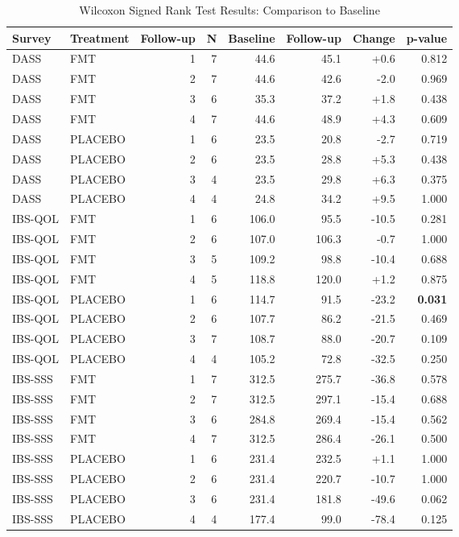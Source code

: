 \begin{table}[htbp]
\centering
\caption{Wilcoxon Signed Rank Test Results: Comparison to Baseline}
\label{tab:wilcoxon_baseline}
\begin{tabular}{llrrrrrr}
\hline
Survey & Treatment & Follow-up & N & Baseline & Follow-up & Change & p-value \\
\hline
DASS & FMT & 1 & 7 & 44.6 & 45.1 & +0.6 & 0.812 \\
DASS & FMT & 2 & 7 & 44.6 & 42.6 & -2.0 & 0.969 \\
DASS & FMT & 3 & 6 & 35.3 & 37.2 & +1.8 & 0.438 \\
DASS & FMT & 4 & 7 & 44.6 & 48.9 & +4.3 & 0.609 \\
DASS & PLACEBO & 1 & 6 & 23.5 & 20.8 & -2.7 & 0.719 \\
DASS & PLACEBO & 2 & 6 & 23.5 & 28.8 & +5.3 & 0.438 \\
DASS & PLACEBO & 3 & 4 & 23.5 & 29.8 & +6.3 & 0.375 \\
DASS & PLACEBO & 4 & 4 & 24.8 & 34.2 & +9.5 & 1.000 \\
IBS-QOL & FMT & 1 & 6 & 106.0 & 95.5 & -10.5 & 0.281 \\
IBS-QOL & FMT & 2 & 6 & 107.0 & 106.3 & -0.7 & 1.000 \\
IBS-QOL & FMT & 3 & 5 & 109.2 & 98.8 & -10.4 & 0.688 \\
IBS-QOL & FMT & 4 & 5 & 118.8 & 120.0 & +1.2 & 0.875 \\
IBS-QOL & PLACEBO & 1 & 6 & 114.7 & 91.5 & -23.2 & \textbf{0.031} \\
IBS-QOL & PLACEBO & 2 & 6 & 107.7 & 86.2 & -21.5 & 0.469 \\
IBS-QOL & PLACEBO & 3 & 7 & 108.7 & 88.0 & -20.7 & 0.109 \\
IBS-QOL & PLACEBO & 4 & 4 & 105.2 & 72.8 & -32.5 & 0.250 \\
IBS-SSS & FMT & 1 & 7 & 312.5 & 275.7 & -36.8 & 0.578 \\
IBS-SSS & FMT & 2 & 7 & 312.5 & 297.1 & -15.4 & 0.688 \\
IBS-SSS & FMT & 3 & 6 & 284.8 & 269.4 & -15.4 & 0.562 \\
IBS-SSS & FMT & 4 & 7 & 312.5 & 286.4 & -26.1 & 0.500 \\
IBS-SSS & PLACEBO & 1 & 6 & 231.4 & 232.5 & +1.1 & 1.000 \\
IBS-SSS & PLACEBO & 2 & 6 & 231.4 & 220.7 & -10.7 & 1.000 \\
IBS-SSS & PLACEBO & 3 & 6 & 231.4 & 181.8 & -49.6 & 0.062 \\
IBS-SSS & PLACEBO & 4 & 4 & 177.4 & 99.0 & -78.4 & 0.125 \\
\hline
\end{tabular}
\end{table}